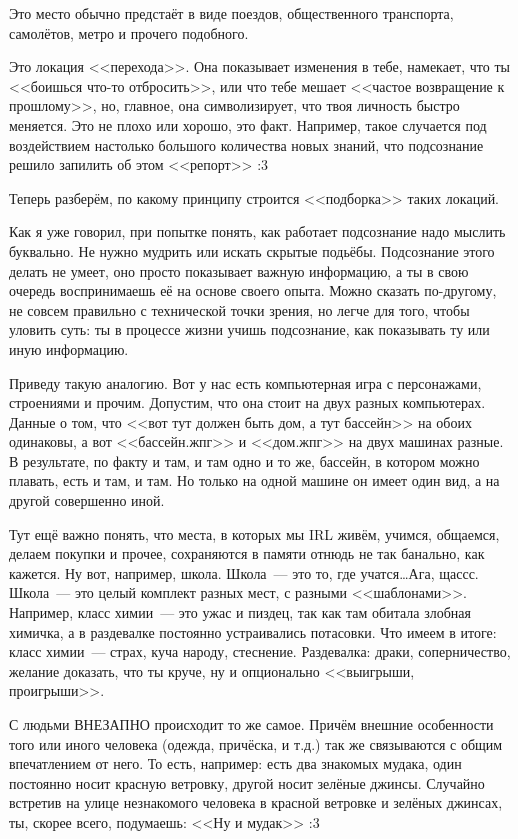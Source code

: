\documentclass[a4paper,14pt,oneside]{memoir}
\begin{document}
Это место обычно предстаёт в виде поездов, общественного транспорта, самолётов, метро и прочего подобного. 

Это локация <<перехода>>. Она показывает изменения в тебе, намекает, что ты <<боишься что-то отбросить>>, или что тебе мешает <<частое возвращение к прошлому>>, но, главное, она символизирует, что твоя личность быстро меняется. Это не плохо или хорошо, это факт. Например, такое случается под воздействием настолько большого количества новых знаний, что подсознание решило запилить об этом <<репорт>> :3
   
Теперь разберём, по какому принципу строится <<подборка>> таких локаций.
 
Как я уже говорил, при попытке понять, как работает подсознание надо мыслить буквально. Не нужно мудрить или искать скрытые подьёбы. Подсознание этого делать не умеет, оно просто показывает важную информацию, а ты в свою очередь воспринимаешь её на основе своего опыта. Можно сказать по-другому, не совсем правильно с технической точки зрения, но легче для того, чтобы уловить суть: ты в процессе жизни учишь подсознание, как показывать ту или иную информацию.
   
Приведу такую аналогию. Вот у нас есть компьютерная игра с персонажами, строениями и прочим. Допустим, что она стоит на двух разных компьютерах. Данные о том, что <<вот тут должен быть дом, а тут бассейн>> на обоих одинаковы, а вот <<бассейн.жпг>> и <<дом.жпг>> на двух машинах разные. В результате, по факту и там, и там одно и то же, бассейн, в котором можно плавать, есть и там, и там. Но только на одной машине он имеет один вид, а на другой совершенно иной. 

Тут ещё важно понять, что места, в которых мы IRL живём, учимся, общаемся, делаем покупки и прочее, сохраняются в памяти отнюдь не так банально, как кажется. Ну вот, например, школа. Школа~--- это то, где учатся\ldots Ага, щассс. Школа~--- это целый комплект разных мест, с разными <<шаблонами>>. Например, класс химии~--- это ужас и пиздец, так как там обитала злобная химичка, а в раздевалке постоянно устраивались потасовки. Что имеем в итоге: класс химии~--- страх, куча народу, стеснение. Раздевалка: драки, соперничество, желание доказать, что ты круче, ну и опционально <<выигрыши, проигрыши>>.
 
С людьми ВНЕЗАПНО происходит то же самое. Причём внешние особенности того или иного человека (одежда, причёска, и т.д.) так же связываются с общим впечатлением от него. То есть, например: есть два знакомых мудака, один постоянно носит красную ветровку, другой носит зелёные джинсы. Случайно встретив на улице незнакомого человека в красной ветровке и зелёных джинсах, ты, скорее всего, подумаешь: <<Ну и мудак>> :3 
\end{document}
